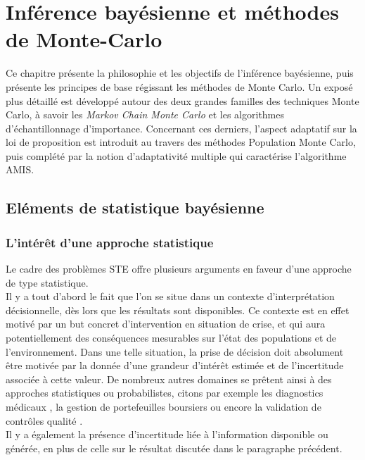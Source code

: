 \chapter{Inférence bayésienne et méthodes de Monte-Carlo}

Ce chapitre présente la philosophie et les objectifs de l'inférence bayésienne, puis présente les principes de base régissant les méthodes de Monte Carlo. Un exposé plus détaillé est développé autour des deux grandes familles des techniques Monte Carlo, à savoir les \textit{Markov Chain Monte Carlo} et les algorithmes d'échantillonnage d'importance. Concernant ces derniers, l'aspect adaptatif sur la loi de proposition est introduit au travers des méthodes Population Monte Carlo, puis complété par la notion d'adaptativité multiple qui caractérise l'algorithme AMIS. 

	
	\section{Eléments de statistique bayésienne}
	
	\subsection{L'intérêt d'une approche statistique}
	\label{ss_erreurs}
	
	Le cadre des problèmes STE offre plusieurs arguments en faveur d'une approche de type statistique.\\
	
	Il y a tout d'abord le fait que l'on se situe dans un contexte d'interprétation décisionnelle, dès lors que les résultats sont disponibles. Ce contexte est en effet motivé par un but concret d'intervention en situation de crise, et qui aura potentiellement des conséquences mesurables sur l'état des populations et de l'environnement. Dans une telle situation, la prise de décision doit absolument être motivée par la donnée d'une grandeur d'intérêt estimée et de l'incertitude associée à cette valeur. De nombreux autres domaines se prêtent ainsi à des approches statistiques ou probabilistes, citons par exemple les diagnostics médicaux \cite{Kononenko2001}, la gestion de portefeuilles boursiers \cite{Bouchaud2003} ou encore la validation de contrôles qualité \cite{Alt2001}.\\
	
	Il y a également la présence d'incertitude liée à l'information disponible ou générée, en plus de celle sur le résultat discutée dans le paragraphe précédent. \\
	
